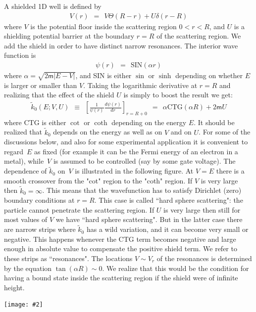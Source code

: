 \documentclass[onecolumn,fleqn]{revtex4}
\newcommand{\mass}{\mathsf{m}}
\newcommand{\putgraph}[2][0.30\hsize]{\texttt{[image: \#2]}}
\newcommand{\beq}{\begin{eqnarray}}
\newcommand{\eeq}{\end{eqnarray}}
\begin{document}
A shielded 1D well is defined by 
\beq
V(r) \ \ = \ \ V \Theta(R-r) + U \delta(r-R) 
\eeq
where $V$ is the potential floor inside 
the scattering region ${0<r<R}$, 
and $U$ is a shielding potential 
barrier at the boundary ${r=R}$ 
of the scattering region. 
We add the shield in order to have 
distinct narrow resonances.   
The interior wave function is 
\beq
\psi(r) \ \ = \ \ \mbox{SIN}(\alpha r)
\eeq
where ${\alpha = \sqrt{2\mass |E-V|}}$, 
and SIN is either $\sin$ or $\sinh$ 
depending on whether $E$ is larger or 
smaller than $V$. 
Taking the logarithmic derivative at ${r=R}$ 
and realizing that the effect of the 
shield $U$ is simply to boost the result we get: 
\beq
\tilde{k}_0(E; V,U) 
\ \ \equiv \ \ \left[\frac{1}{\psi(r)}\frac{d\psi(r)}{dr}\right]_{r=R+0}
\ \ = \ \ \alpha \mbox{CTG}(\alpha R) + 2\mass U
\eeq
where CTG is either $\cot$ or $\coth$ 
depending on the energy $E$. 
It should be realized that $\tilde{k}_0$ 
depends on the energy as well as on $V$ 
and on $U$. For some of the discussions 
below, and also for some experimental application 
it is convenient to regard~$E$ 
as fixed (for example it can be the Fermi energy 
of an electron in a metal), 
while~$V$ is assumed to be controlled 
(say by some gate voltage). 
The dependence of $\tilde{k}_0$     
on~$V$ is illustrated in the following figure.  
At $V=E$ there is a smooth crossover 
from the "cot" region to the "coth" region.
If $V$ is very large then $\tilde{k}_0=\infty$. 
This means that the wavefunction has to 
satisfy Dirichlet (zero) boundary conditions at ${r=R}$. 
This case is called ``hard sphere scattering": 
the particle cannot penetrate the scattering 
region. If $U$ is very large then still for most 
values of $V$ we have ``hard sphere scattering".
But in the latter case there are narrow strips 
where $\tilde{k}_0$ has a wild variation, 
and it can become very small or negative.
This happens whenever the CTG term 
becomes negative and large enough in absolute
value to compensate the positive shield term.   
We refer to these strips as ``resonances". 
The locations ${V \sim V_r}$ of the resonances 
is determined by the 
equation $\tan(\alpha R) \sim 0$. 
We realize that this would be the condition 
for having a bound state inside the scattering 
region if the shield were of infinite height. 


\begin{center}
\putgraph[0.4\hsize]{AttractiveWellklV}
\end{center}
\end{document}
